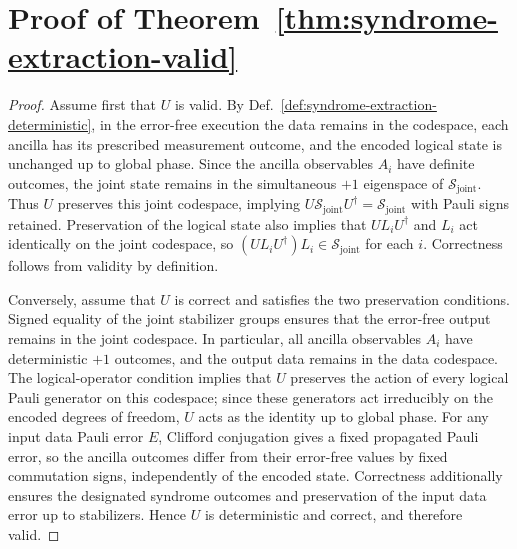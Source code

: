 \documentclass[acmsmall,screen,review,anonymous,nonacm]{acmart}
\begin{document}
\section{Proof of Theorem~\ref{thm:syndrome-extraction-valid}}
\label{app:proof-syndrome-extraction}

\begin{proof}
Assume first that $U$ is valid. By
Def.~\ref{def:syndrome-extraction-deterministic}, in the error-free
execution the data remains in the codespace, each ancilla has its
prescribed measurement outcome, and the encoded logical state is
unchanged up to global phase. Since the ancilla observables $A_i$
have definite outcomes, the joint state remains in the simultaneous
$+1$ eigenspace of $\mathcal S_{\mathrm{joint}}$.
Thus $U$ preserves this joint codespace, implying
$U\mathcal S_{\mathrm{joint}}U^\dagger=\mathcal S_{\mathrm{joint}}$
with Pauli signs retained. Preservation of the logical state also
implies that $UL_iU^\dagger$ and $L_i$ act identically on the joint
codespace, so $(UL_iU^\dagger)L_i\in\mathcal S_{\mathrm{joint}}$
for each $i$. Correctness follows from validity by definition.

Conversely, assume that $U$ is correct and satisfies the two
preservation conditions. Signed equality of the joint stabilizer
groups ensures that the error-free output remains in the joint
codespace. In particular, all ancilla observables $A_i$ have
deterministic $+1$ outcomes, and the output data remains in the
data codespace. The logical-operator condition implies that $U$
preserves the action of every logical Pauli generator on this
codespace; since these generators act irreducibly on the encoded
degrees of freedom, $U$ acts as the identity up to global phase.
For any input data Pauli error $E$, Clifford conjugation gives
a fixed propagated Pauli error, so the ancilla outcomes differ
from their error-free values by fixed commutation signs,
independently of the encoded state. Correctness additionally
ensures the designated syndrome outcomes and preservation of
the input data error up to stabilizers. Hence $U$ is
deterministic and correct, and therefore valid.
\end{proof}
\end{document}

